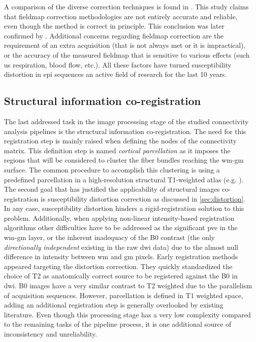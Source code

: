 A comparison of the diverse correction techniques is found in \citep{wu_comparison_2008}.
This study claims that fieldmap correction methodologies are not entirely accurate
and reliable, even though the method is correct in principle. This conclusion
was later confirmed by \citep{tao_variational_2009}. Additional concerns regarding
fieldmap correction are the requirement of an extra acquisition (that is not always
met or it is impractical), or the accuracy of the measured fieldmap that is sensitive
to various effects (such us respiration, blood flow, etc.). All these factors 
have turned susceptibility distortion in \gls{epi} sequences an active field of 
research for the last 10 years.


\subsection{Structural information co-registration}
\label{sec:registration}

The last addressed task in the image processing stage of the studied 
connectivity analysis pipelines is the structural information co-registration.
The need for this registration step is mainly raised when defining the 
nodes of the connectivity matrix. This definition step is named
\textit{cortical parcellation} as it imposes the regions that will be
considered to cluster the fiber bundles reaching the \gls{wm}-\gls{gm}
surface. The common procedure to accomplish this clustering is using
a predefined parcellation in a high-resolution structural T1-weighted 
atlas (e.g. \citep{greve_accurate_2009}). The second goal that has 
justified the applicability of structural
images co-registration is susceptibility distortion correction
as discussed in \autoref{sec:distortion}. In any case, susceptibility 
distortion hinders a rigid-registration solution to this problem.
Additionally, when applying non-linear intensity-based
registration algorithms other difficulties have to be addressed as
the significant \gls{pve} in the \gls{wm}-\gls{gm} layer, or the
inherent inadequacy of the B0 contrast (the only \textit{directionally
independent} existing in the raw \gls{dwi} data) due to the almost null
difference in intensity between \gls{wm} and \gls{gm} pixels. Early 
registration methods appeared targeting the distortion correction.
They quickly standardized the choice of T2 as anatomically correct source
to be registered against the B0 in \gls{dwi}. B0 images have a very similar
contrast to T2 weighted due to the parallelism of acquisition sequences.
However, parcellation is defined in T1 weighted space, adding an additional 
registration step is generally overlooked by existing literature. Even though this
processing stage has a very low complexity compared to the remaining tasks of 
the pipeline process, it is one additional source of inconsistency
and unreliability.


